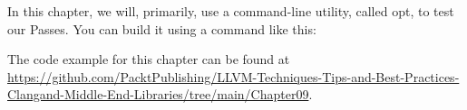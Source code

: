In this chapter, we will, primarily, use a command-line utility, called opt, to test our Passes. You can build it using a command like this:


The code example for this chapter can be found at \url{https://github.com/PacktPublishing/LLVM-Techniques-Tips-and-Best-Practices-Clangand-Middle-End-Libraries/tree/main/Chapter09}.




























